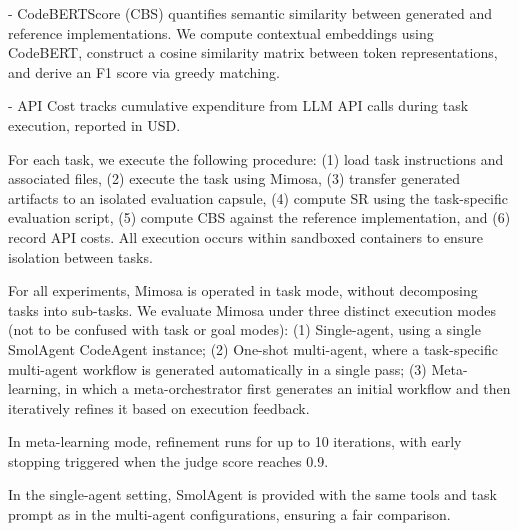 \documentclass{article}
\begin{document}
- CodeBERTScore (CBS) quantifies semantic similarity between generated and reference implementations. We compute contextual embeddings using CodeBERT, construct a cosine similarity matrix between token representations, and derive an F1 score via greedy matching.

- API Cost tracks cumulative expenditure from LLM API calls during task execution, reported in USD.

For each task, we execute the following procedure: (1) load task instructions and associated files, (2) execute the task using Mimosa, (3) transfer generated artifacts to an isolated evaluation capsule, (4) compute SR using the task-specific evaluation script, (5) compute CBS against the reference implementation, and (6) record API costs. All execution occurs within sandboxed containers to ensure isolation between tasks.

For all experiments, Mimosa is operated in task mode, without decomposing tasks into sub-tasks. We evaluate Mimosa under three distinct execution modes (not to be confused with task or goal modes):
(1) Single-agent, using a single SmolAgent CodeAgent instance;
(2) One-shot multi-agent, where a task-specific multi-agent workflow is generated automatically in a single pass;
(3) Meta-learning, in which a meta-orchestrator first generates an initial workflow and then iteratively refines it based on execution feedback.

In meta-learning mode, refinement runs for up to 10 iterations, with early stopping triggered when the judge score reaches 0.9.

In the single-agent setting, SmolAgent is provided with the same tools and task prompt as in the multi-agent configurations, ensuring a fair comparison.



\end{document}

